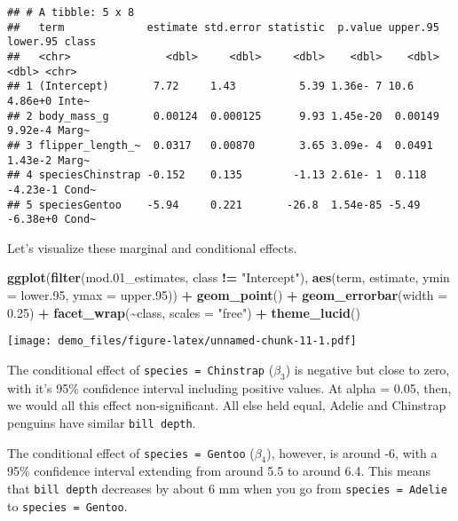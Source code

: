 \documentclass[
]{article}
\newenvironment{Shaded}{\begin{snugshade}}{\end{snugshade}}
\newcommand{\AttributeTok}[1]{\textcolor[rgb]{0.13,0.29,0.53}{#1}}
\newcommand{\FloatTok}[1]{\textcolor[rgb]{0.00,0.00,0.81}{#1}}
\newcommand{\FunctionTok}[1]{\textcolor[rgb]{0.13,0.29,0.53}{\textbf{#1}}}
\newcommand{\NormalTok}[1]{#1}
\newcommand{\SpecialCharTok}[1]{\textcolor[rgb]{0.81,0.36,0.00}{\textbf{#1}}}
\newcommand{\StringTok}[1]{\textcolor[rgb]{0.31,0.60,0.02}{#1}}
\begin{document}
\begin{verbatim}
## # A tibble: 5 x 8
##   term             estimate std.error statistic  p.value upper.95 lower.95 class
##   <chr>               <dbl>     <dbl>     <dbl>    <dbl>    <dbl>    <dbl> <chr>
## 1 (Intercept)       7.72     1.43          5.39 1.36e- 7 10.6      4.86e+0 Inte~
## 2 body_mass_g       0.00124  0.000125      9.93 1.45e-20  0.00149  9.92e-4 Marg~
## 3 flipper_length_~  0.0317   0.00870       3.65 3.09e- 4  0.0491   1.43e-2 Marg~
## 4 speciesChinstrap -0.152    0.135        -1.13 2.61e- 1  0.118   -4.23e-1 Cond~
## 5 speciesGentoo    -5.94     0.221       -26.8  1.54e-85 -5.49    -6.38e+0 Cond~
\end{verbatim}

Let's visualize these marginal and conditional effects.

\begin{Shaded}
\begin{Highlighting}[]
\FunctionTok{ggplot}\NormalTok{(}\FunctionTok{filter}\NormalTok{(mod}\FloatTok{.01}\NormalTok{\_estimates, class }\SpecialCharTok{!=} \StringTok{"Intercept"}\NormalTok{), }
       \FunctionTok{aes}\NormalTok{(term, estimate, }
           \AttributeTok{ymin =}\NormalTok{ lower}\FloatTok{.95}\NormalTok{, }
           \AttributeTok{ymax =}\NormalTok{ upper}\FloatTok{.95}\NormalTok{)) }\SpecialCharTok{+}
  \FunctionTok{geom\_point}\NormalTok{() }\SpecialCharTok{+}
  \FunctionTok{geom\_errorbar}\NormalTok{(}\AttributeTok{width =} \FloatTok{0.25}\NormalTok{) }\SpecialCharTok{+}
  \FunctionTok{facet\_wrap}\NormalTok{(}\SpecialCharTok{\textasciitilde{}}\NormalTok{class, }\AttributeTok{scales =} \StringTok{"free"}\NormalTok{) }\SpecialCharTok{+}
  \FunctionTok{theme\_lucid}\NormalTok{()}
\end{Highlighting}
\end{Shaded}

\texttt{[image: demo\_files/figure-latex/unnamed-chunk-11-1.pdf]}

The conditional effect of \texttt{species\ =\ Chinstrap} (\(\beta_3\))
is negative but close to zero, with it's 95\% confidence interval
including positive values. At alpha = 0.05, then, we would all this
effect non-significant. All else held equal, Adelie and Chinstrap
penguins have similar \texttt{bill\ depth}.

The conditional effect of \texttt{species\ =\ Gentoo} (\(\beta_4\)),
however, is around -6, with a 95\% confidence interval extending from
around 5.5 to around 6.4. This means that \texttt{bill\ depth} decreases
by about 6 mm when you go from \texttt{species\ =\ Adelie} to
\texttt{species\ =\ Gentoo}.
\end{document}
